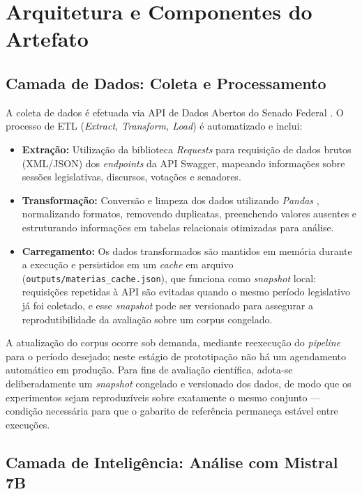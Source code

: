 \section{Arquitetura e Componentes do Artefato}

\subsection{Camada de Dados: Coleta e Processamento}

A coleta de dados é efetuada via API de Dados Abertos do Senado Federal \cite{SenadoFederal_s_d}. O processo de ETL (\textit{Extract, Transform, Load}) é automatizado e inclui:

\begin{itemize}
    \item \textbf{Extração:} Utilização da biblioteca \textit{Requests} \cite{RequestsLib} para requisição de dados brutos (XML/JSON) dos \textit{endpoints} da API Swagger, mapeando informações sobre sessões legislativas, discursos, votações e senadores.

    \item \textbf{Transformação:} Conversão e limpeza dos dados utilizando \textit{Pandas} \cite{PandasLib}, normalizando formatos, removendo duplicatas, preenchendo valores ausentes e estruturando informações em tabelas relacionais otimizadas para análise.

    \item \textbf{Carregamento:} Os dados transformados são mantidos em memória durante a execução e persistidos em um \textit{cache} em arquivo (\texttt{outputs/materias\_cache.json}), que funciona como \textit{snapshot} local: requisições repetidas à API são evitadas quando o mesmo período legislativo já foi coletado, e esse \textit{snapshot} pode ser versionado para assegurar a reprodutibilidade da avaliação sobre um corpus congelado.
\end{itemize}

A atualização do corpus ocorre sob demanda, mediante reexecução do \textit{pipeline} para o período desejado; neste estágio de prototipação não há um agendamento automático em produção. Para fins de avaliação científica, adota-se deliberadamente um \textit{snapshot} congelado e versionado dos dados, de modo que os experimentos sejam reproduzíveis sobre exatamente o mesmo conjunto --- condição necessária para que o gabarito de referência permaneça estável entre execuções.

\subsection{Camada de Inteligência: Análise com Mistral 7B}

